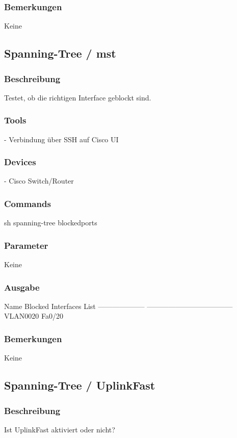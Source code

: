 \documentclass[a4,12pt]{scrartcl}
\begin{document}
\subsubsection{Bemerkungen}
Keine



\subsection{Spanning-Tree / mst}
\subsubsection{Beschreibung}
Testet, ob die richtigen Interface geblockt sind.
\subsubsection{Tools}
- Verbindung über SSH auf Cisco UI 
\subsubsection{Devices}
- Cisco Switch/Router
\subsubsection{Commands}
sh spanning-tree blockedports
\subsubsection{Parameter}
Keine
\subsubsection{Ausgabe}
Name                 Blocked Interfaces List\newline
-------------------- ------------------------------------\newline
VLAN0020             Fa0/20\newline
\subsubsection{Bemerkungen}
Keine


\subsection{Spanning-Tree / UplinkFast}
\subsubsection{Beschreibung}
Ist UplinkFast aktiviert oder nicht?
\end{document}
